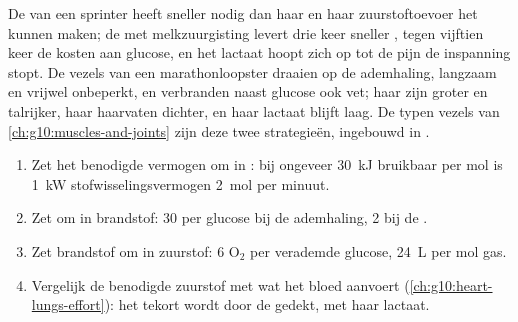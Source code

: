 \begin{example}\label{ex:g12:respiration-fermentation:muscle}
De  van een sprinter heeft sneller  nodig dan haar
 en haar zuurstoftoevoer het kunnen maken; de  met
melkzuurgisting levert drie keer sneller , tegen vijftien keer de
kosten aan glucose, en het lactaat hoopt zich op tot de pijn de
inspanning stopt. De vezels van een marathonloopster draaien op de
ademhaling, langzaam en vrijwel onbeperkt, en verbranden naast glucose ook
vet; haar  zijn groter en talrijker, haar haarvaten dichter,
en haar lactaat blijft laag. De typen vezels van
\cref{ch:g10:muscles-and-joints} zijn deze twee strategieën, ingebouwd in
.
\end{example}

\begin{method}\label{met:g12:respiration-fermentation:budget}
\begin{enumerate}
  \item Zet het benodigde vermogen om in : bij ongeveer \qty{30}{kJ}
        bruikbaar per mol  is \qty{1}{kW} stofwisselingsvermogen
        \qty{2}{mol}  per minuut.
  \item Zet  om in brandstof: 30  per glucose bij de ademhaling, 2
        bij de .
  \item Zet brandstof om in zuurstof: 6 $\mathrm{O_2}$ per verademde
        glucose, \qty{24}{L} per mol gas.
  \item Vergelijk de benodigde zuurstof met wat het bloed aanvoert
        (\cref{ch:g10:heart-lungs-effort}): het tekort wordt door de
         gedekt, met haar lactaat.
\end{enumerate}
\end{method}

